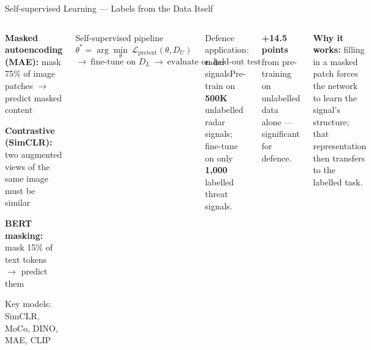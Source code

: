 \documentclass[aspectratio=169,10pt,t]{beamer}
\begin{document}
\begin{frame}{Self-supervised Learning --- Labels from the Data Itself}
\begin{columns}[T]
\begin{tl}\item \textbf{Masked autoencoding (MAE):} mask 75\% of image patches $\to$ predict masked content
\item \textbf{Contrastive (SimCLR):} two augmented views of the same image must be similar
\item \textbf{BERT masking:} mask 15\% of text tokens $\to$ predict them
\item Key models: SimCLR, MoCo, DINO, MAE, CLIP\end{tl}
\begin{fbx}{Self-supervised pipeline}\[\theta^{*}=\arg\min_\theta\,\mathcal{L}_{\text{pretext}}(\theta,D_U)\]\[\longrightarrow\ \text{fine-tune on }D_L\ \longrightarrow\ \text{evaluate on held-out test}\]\end{fbx}
\begin{cbox}[ISSAamb]{Defence application: radar signals}\scriptsize Pre-train on \textbf{500K} unlabelled radar signals; fine-tune on only \textbf{1,000} labelled threat signals.\end{cbox}
\begin{rbox}\scriptsize\textbf{+14.5 points} from pre-training on unlabelled data alone --- significant for defence.\end{rbox}
\begin{ibox}\scriptsize\textbf{Why it works:} filling in a masked patch forces the network to learn the signal's structure; that representation then transfers to the labelled task.\end{ibox}
\end{columns}
\end{frame}
\end{document}

